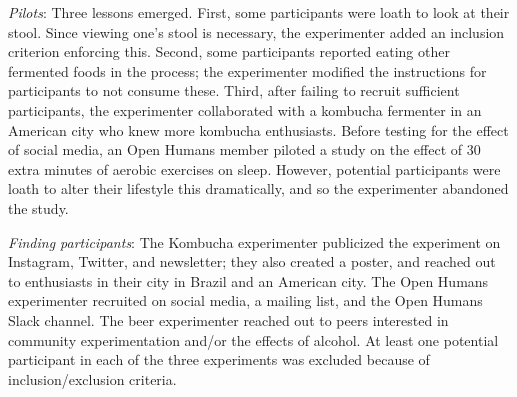 \textit{Pilots}: Three lessons emerged. First, some participants were loath to look at their stool. Since viewing one's stool is necessary, the experimenter added an inclusion criterion enforcing this. Second, some participants reported eating other fermented foods in the process; the experimenter modified the instructions for participants to not consume these. Third, after failing to recruit sufficient participants, the experimenter collaborated with a kombucha fermenter in an American city who knew more kombucha enthusiasts. Before testing for the effect of social media, an Open Humans member piloted a study on the effect of 30 extra minutes of aerobic exercises on sleep. However, potential participants were loath to alter their lifestyle this dramatically, and so the experimenter abandoned the study.
 
\textit{Finding participants}: The Kombucha experimenter publicized the experiment on Instagram, Twitter, and newsletter; they also created a poster, and reached out to enthusiasts in their city in Brazil and an American city. The Open Humans experimenter recruited on social media, a mailing list, and the Open Humans Slack channel. The beer experimenter reached out to peers interested in community experimentation and/or the effects of alcohol. At least one potential participant in each of the three experiments was excluded because of inclusion/exclusion criteria. 


